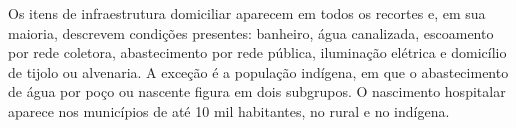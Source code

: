 





Os itens de infraestrutura domiciliar aparecem em todos os recortes e, em sua maioria, descrevem condições presentes: banheiro, água canalizada, escoamento por rede coletora, abastecimento por rede pública, iluminação elétrica e domicílio de tijolo ou alvenaria. A exceção é a população indígena, em que o abastecimento de água por poço ou nascente figura em dois subgrupos. O nascimento hospitalar aparece nos municípios de até 10 mil habitantes, no rural e no indígena.

